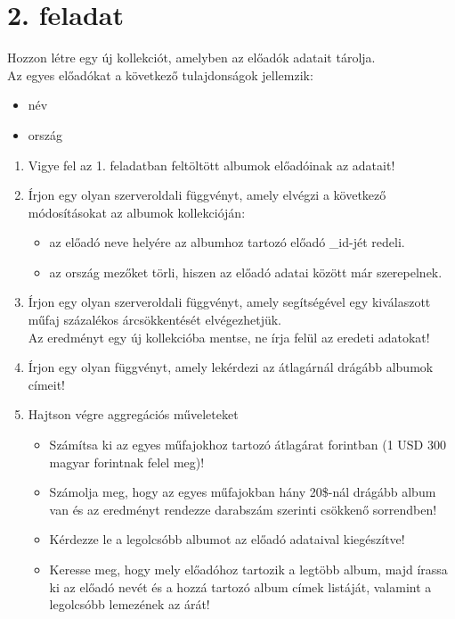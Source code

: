 \documentclass[a4paper, 12pt]{article}
\begin{document}
\section*{2. feladat}
Hozzon létre egy új kollekciót, amelyben az előadók adatait tárolja.\\
Az egyes előadókat a következő tulajdonságok jellemzik:
\begin{itemize}[noitemsep]
	\item név
	\item ország
\end{itemize}
\begin{enumerate}[label=\textbf{\alph*)}]
\item Vigye fel az 1. feladatban feltöltött albumok előadóinak az adatait!
\newpage \item Írjon egy olyan szerveroldali függvényt, amely elvégzi a következő módosításokat az albumok kollekcióján:
	  \begin{itemize}[label=-]
	  \item az előadó neve helyére az albumhoz tartozó előadó \_id-jét redeli.
	  \item az ország mezőket törli, hiszen az előadó adatai között már szerepelnek.
	  \end{itemize}
\item Írjon egy olyan szerveroldali függvényt, amely segítségével egy kiválaszott műfaj százalékos árcsökkentését elvégezhetjük.\\Az eredményt egy új kollekcióba mentse, ne írja felül az eredeti adatokat!
\item Írjon egy olyan függvényt, amely lekérdezi az átlagárnál drágább albumok címeit!
\item Hajtson végre aggregációs műveleteket
	  \begin{itemize}[label=-]
	  \item Számítsa ki az egyes műfajokhoz tartozó átlagárat forintban (1 USD 300 magyar forintnak felel meg)!
	  \item Számolja meg, hogy az egyes műfajokban hány 20\$-nál drágább album van és az eredményt rendezze darabszám szerinti csökkenő sorrendben!
	  \item Kérdezze le a legolcsóbb albumot az előadó adataival kiegészítve!
	  \item Keresse meg, hogy mely előadóhoz tartozik a legtöbb album, majd írassa ki az előadó nevét és a hozzá tartozó album címek listáját, valamint a legolcsóbb lemezének az árát!
	  \end{itemize}
\end{enumerate}
\end{document}
